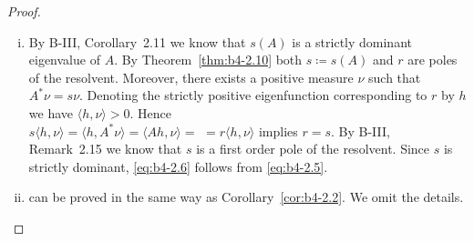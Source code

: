 \begin{proof}
	\begin{enumerate}[(i), wide]
		\item 
		By B-III, Corollary~2.11 we know that $s(A)$ is a strictly dominant eigenvalue of $A$. 
        By Theorem~\ref{thm:b4-2.10} both $s  \coloneq  s(A)$ and $r$ are poles of the resolvent. 
        Moreover, there exists a positive measure $\nu$ such that $A^*\nu = s\nu$. 
        Denoting the strictly positive eigenfunction corresponding to $r$ by $h$ we have $\langle h,\nu \rangle > 0$. 
        Hence 
        \\
        $s\langle h,\nu \rangle = \langle h,A^*\nu \rangle = \langle Ah,\nu \rangle =$ $= r\langle h,\nu \rangle$ implies $r = s$. By B-III, Remark~2.15 we know that $s$ is a first order pole of the resolvent. Since $s$ is strictly dominant, \eqref{eq:b4-2.6} follows from \eqref{eq:b4-2.5}.

		\item 
		can be proved in the same way as Corollary~\ref{cor:b4-2.2}. We omit the details.
	\end{enumerate}
\end{proof}

